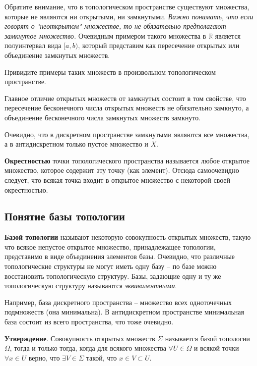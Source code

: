\documentclass[a4paper]{book}
\begin{document}
Обратите внимание, что в топологическом пространстве существуют множества, которые не являются ни открытыми, ни замкнутыми. \textit{Важно понимать, что если говорят о "неоткрытом" множестве, то не обязательно предполагают замкнутое множество.} Очевидным примером такого множества в $\mathbb{R}$ является полуинтервал вида $[a,b)$, который представим как пересечение открытых или объединение замкнутых множеств. 

Привидите примеры таких множеств в произвольном топологическом пространстве. 

Главное отличие открытых множеств от замкнутых состоит в том свойстве, что пересечение бесконечного числа открытых множеств не обязательно замкнуто, а объединение бесконечного числа замкнутых множеств замкнуто. 

Очевидно, что в дискретном пространстве замкнутыми являются все множества, а в антидискретном только пустое множество и $X$. 

\textbf{Окрестностью} точки топологического пространства называется любое открытое множество, которое содержит эту точку (как элемент). Отсюда самоочевидно следует, что всякая точка входит в открытое множество с некоторой своей окрестностью. 
 
\subsection{Понятие базы топологии}

\textbf{Базой топологии} называют некоторую совокупность открытых множеств, такую что всякое непустое открытое множество, принадлежащее топологии, представимо в виде объединения элементов базы. Очевидно, что различные топологические структуры не могут иметь одну базу -- по базе можно восстановить топологическую структуру. Базы, задающие одну и ту же топологическую структуру называются \textit{эквивалентными}.

Например, база дискретного пространства -- множество всех одноточечных подмножеств (она минимальна). В антидискретном пространстве минимальная база состоит из всего пространства, что тоже очевидно. 

\textbf{Утверждение}. Совокупность открытых множеств $\varSigma$ называется базой топологии $\Omega$, тогда и только тогда, когда для всякого множества $\forall U\in\Omega$ и всякой точки $\forall x\in U$ верно, что $\exists V \in \varSigma$ такой, что $x\in V\subset U$. 
\end{document}
